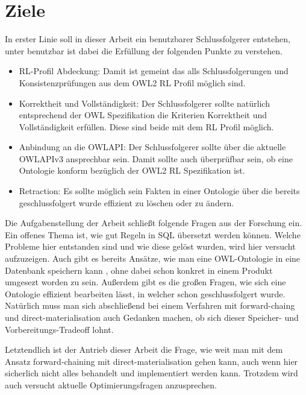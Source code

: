 \section{Ziele}
\label{abschnitt-ziele}

In erster Linie soll in dieser Arbeit ein benutzbarer Schlussfolgerer entstehen, unter benutzbar ist dabei die Erfüllung der folgenden Punkte zu verstehen.

\begin{itemize}
  \item RL-Profil Abdeckung: Damit ist gemeint das alls Schlussfolgerungen und Konsistenzprüfungen aus dem OWL2 RL Profil möglich sind.
  \item Korrektheit und Vollständigkeit: Der Schlussfolgerer sollte natürlich entsprechend der OWL Spezifikation die Kriterien Korrektheit und Vollständigkeit erfüllen. Diese sind beide mit dem RL Profil möglich.
  \item Anbindung an die OWLAPI: Der Schlussfolgerer sollte über die aktuelle OWLAPIv3 ansprechbar sein. Damit sollte auch überprüfbar sein, ob eine Ontologie konform bezüglich der OWL2 RL Spezifikation ist.
  \item Retraction: Es sollte möglich sein Fakten in einer Ontologie über die bereits geschlussfolgert wurde effizient zu löschen oder zu ändern.
\end{itemize}

Die Aufgabenstellung der Arbeit schließt folgende Fragen aus der Forschung ein. Ein offenes Thema ist, wie gut Regeln in SQL übersetzt werden können. Welche Probleme hier entstanden sind und wie diese gelöst wurden, wird hier versucht aufzuzeigen. Auch gibt es bereits Ansätze, wie man eine OWL-Ontologie in eine Datenbank speichern kann \cite{Kleb2009OWLDB}, ohne dabei schon konkret in einem Produkt umgesezt worden zu sein. Außerdem gibt es die großen Fragen, wie sich eine Ontologie effizient bearbeiten lässt, in welcher schon geschlussfolgert wurde. Natürlich muss man sich abschließend bei einem Verfahren mit forward-chaing und direct-materialisation auch Gedanken machen, ob sich dieser Speicher- und Vorbereitungs-Tradeoff lohnt.

Letztendlich ist der Antrieb dieser Arbeit die Frage, wie weit man mit dem Ansatz forward-chaining mit direct-materialisation gehen kann, auch wenn hier sicherlich nicht alles behandelt und implementiert werden kann. Trotzdem wird auch versucht aktuelle Optimierungsfragen anzusprechen.


